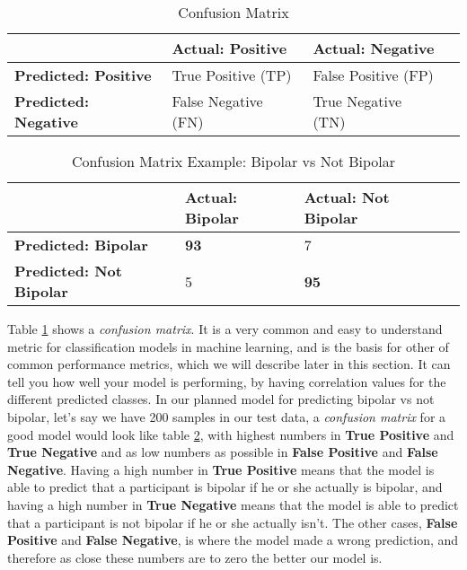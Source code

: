 \begin{table}
  \begin{center}
    \begin{tabular}{| l | l | l | l |}
      \hline
                                    & \textbf{Actual: Positive} & \textbf{Actual: Negative} \\ \hline
      \textbf{Predicted: Positive}  & True Positive (TP)        & False Positive (FP)       \\ \hline
      \textbf{Predicted: Negative}  & False Negative (FN)       & True Negative (TN)        \\
      \hline
    \end{tabular}
    \caption{Confusion Matrix}
    \label{table:confusion_matrix}
  \end{center}
\end{table}

\begin{table}
  \begin{center}
    \begin{tabular}{| l | l | l | l |}
      \hline
                                      & \textbf{Actual: Bipolar} & \textbf{Actual: Not Bipolar} \\ \hline
      \textbf{Predicted: Bipolar}     & \textbf{93}              & 7                            \\ \hline
      \textbf{Predicted: Not Bipolar} & 5                        & \textbf{95}                  \\
      \hline
    \end{tabular}
    \caption{Confusion Matrix Example: Bipolar vs Not Bipolar}
    \label{table:confusion_matrix_bipolar}
  \end{center}
\end{table}

Table \ref{table:confusion_matrix} shows a \textit{confusion matrix}. It is a very common and easy to understand metric for classification models in machine 
learning, and is the basis for other of common performance metrics, which we will describe later in this section. It can tell you how well your model is performing, 
by having correlation values for the different predicted classes. In our planned model for 
predicting bipolar vs not bipolar, let's say we have 200 samples in our test data, a \textit{confusion matrix} for a good model would look like 
table \ref{table:confusion_matrix_bipolar}, with highest numbers in \textbf{True Positive} and \textbf{True Negative} and as low numbers as possible in 
\textbf{False Positive} and \textbf{False Negative}. Having a high number in \textbf{True Positive} means that the model is able to predict that a 
participant is bipolar if he or she actually is bipolar, and having a high number in \textbf{True Negative} means that the model is able to predict 
that a participant is not bipolar if he or she actually isn't. The other cases, \textbf{False Positive} and \textbf{False Negative}, is where the model
made a wrong prediction, and therefore as close these numbers are to zero the better our model is.

